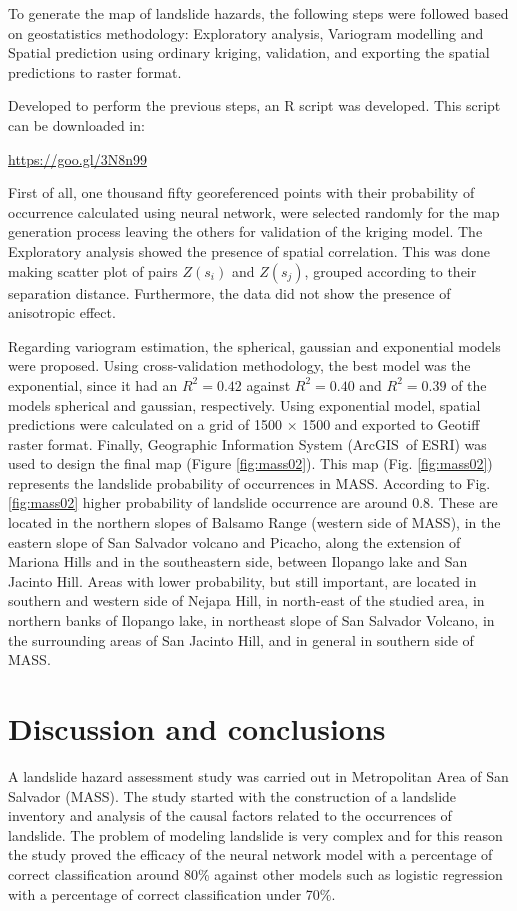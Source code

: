 \documentclass[11pt,twoside]{rmta2010eng}%
\begin{document}
To generate the map of landslide hazards, the following steps were followed based on geostatistics methodology: Exploratory analysis, Variogram modelling and Spatial prediction using ordinary kriging, validation, and exporting the spatial predictions to raster format. 

Developed to perform the previous steps, an R script was developed. This script can be downloaded in:

\url{https://goo.gl/3N8n99}

First of all, one thousand fifty georeferenced points with their probability of occurrence calculated using neural network, were selected randomly for the map generation process leaving the others for validation of the kriging model. The Exploratory analysis showed the presence of spatial correlation. This was done making scatter plot of pairs $Z(s_{i})$ and  $Z(s_{j})$, grouped according to their separation distance. Furthermore, the data did not show the presence of anisotropic effect. 

Regarding variogram estimation, the spherical, gaussian and exponential models were proposed. Using cross-validation methodology, the best model was the exponential, since it had an $ R^{2} = 0.42 $ against $ R^{2} = 0.40 $ and $ R^{2} = 0.39 $ of the models spherical and gaussian, respectively. Using exponential model, spatial predictions were calculated on a grid of 1500 $\times$ 1500 and exported to Geotiff raster format. Finally, Geographic Information System (ArcGIS\textregistered \  of ESRI) was used to design the final map (Figure \ref{fig:mass02}). This map (Fig. \ref{fig:mass02}) represents the landslide probability of occurrences in MASS. According to Fig. \ref{fig:mass02} higher probability of landslide occurrence are around 0.8. These are located in the northern slopes of Balsamo Range (western side of MASS), in the eastern slope of San Salvador volcano and Picacho,  along the extension of Mariona Hills  and in the southeastern side, between Ilopango lake and San Jacinto Hill. Areas with lower probability, but still important, are located in southern and western side of Nejapa Hill, in north-east of the studied area, in northern banks of Ilopango lake, in northeast slope of San Salvador Volcano, in the surrounding areas of San Jacinto Hill, and in general in southern side of MASS. 





\section{Discussion and conclusions}
A landslide hazard assessment study was carried out in Metropolitan Area of San Salvador (MASS). The study started with the construction of a landslide inventory and analysis of the causal factors related to the occurrences of landslide. The problem of modeling landslide is very complex and for this reason the study proved the efficacy of the neural network model with a percentage of correct classification around 80\% against other models such as logistic regression with a percentage of correct classification under 70\%. 
\end{document}
